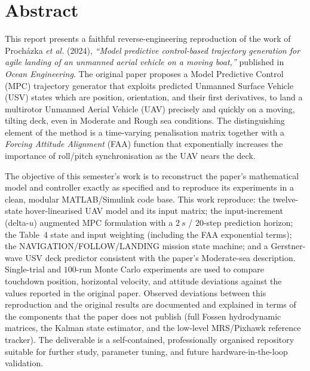 \documentclass[12pt,a4paper]{report}
\begin{document}
\chapter*{Abstract}
This report presents a faithful reverse-engineering reproduction of the work of Proch\'azka \emph{et al.} (2024), \emph{``Model predictive control-based trajectory generation for agile landing of an unmanned aerial vehicle on a moving boat,''} published in \emph{Ocean Engineering}. The original paper proposes a Model Predictive Control (MPC) trajectory generator that exploits predicted Unmanned Surface Vehicle (USV) states which are position, orientation, and their first derivatives, to land a multirotor Unmanned Aerial Vehicle (UAV) precisely and quickly on a moving, tilting deck, even in Moderate and Rough sea conditions. The distinguishing element of the method is a time-varying penalisation matrix together with a \emph{Forcing Attitude Alignment} (FAA) function that exponentially increases the importance of roll/pitch synchronisation as the UAV nears the deck.

The objective of this semester's work is to reconstruct the paper's mathematical model and controller exactly as specified and to reproduce its experiments in a clean, modular MATLAB/Simulink code base. This work reproduce: the twelve-state hover-linearised UAV model and its input matrix; the input-increment (delta-$u$) augmented MPC formulation with a $\SI{2}{s}$ / $20$-step prediction horizon; the Table~4 state and input weighting (including the FAA exponential terms); the NAVIGATION/FOLLOW/LANDING mission state machine; and a Gerstner-wave USV deck predictor consistent with the paper's Moderate-sea description. Single-trial and $100$-run Monte Carlo experiments are used to compare touchdown position, horizontal velocity, and attitude deviations against the values reported in the original paper. Observed deviations between this reproduction and the original results are documented and explained in terms of the components that the paper does not publish (full Fossen hydrodynamic matrices, the Kalman state estimator, and the low-level MRS/Pixhawk reference tracker). The deliverable is a self-contained, professionally organised repository suitable for further study, parameter tuning, and future hardware-in-the-loop validation.

\tableofcontents
\listoffigures
\listoftables
\clearpage
{}

\end{document}
